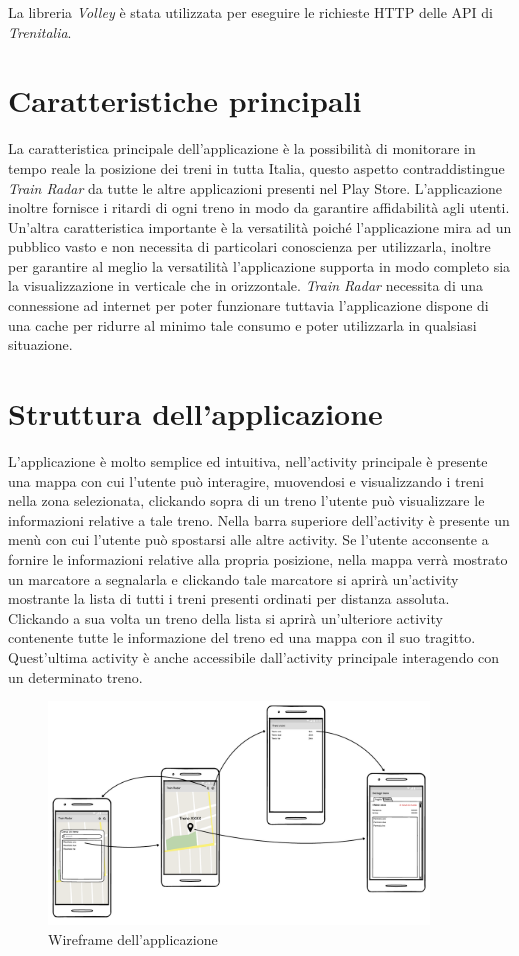 \documentclass[a4paper,10pt]{article}
\begin{document}
    \medskip
    \noindent
    La libreria \emph{Volley} \cite{volley} è stata utilizzata per eseguire le richieste HTTP delle API di \emph{Trenitalia}.

\section{Caratteristiche principali}
  La caratteristica principale dell'applicazione è la possibilità di monitorare in tempo reale la posizione dei treni in tutta Italia, questo aspetto contraddistingue \emph{Train Radar} da tutte le altre applicazioni presenti nel Play Store. L'applicazione inoltre fornisce i ritardi di ogni treno in modo da garantire affidabilità agli utenti. Un'altra caratteristica importante è la versatilità poiché l'applicazione mira ad un pubblico vasto e non necessita di particolari conoscienza per utilizzarla, inoltre per garantire al meglio la versatilità l'applicazione supporta in modo completo sia la visualizzazione in verticale che in orizzontale. \emph{Train Radar} necessita di una connessione ad internet per poter funzionare tuttavia l'applicazione dispone di una cache per ridurre al minimo tale consumo e poter utilizzarla in qualsiasi situazione.

\section{Struttura dell'applicazione}
  L'applicazione è molto semplice ed intuitiva, nell'activity principale è presente una mappa con cui l'utente può interagire, muovendosi e visualizzando i treni nella zona selezionata, clickando sopra di un treno l'utente può visualizzare le informazioni relative a tale treno. Nella barra superiore dell'activity è presente un menù con cui l'utente può spostarsi alle altre activity. Se l'utente acconsente a fornire le informazioni relative alla propria posizione, nella mappa verrà mostrato un marcatore a segnalarla e clickando tale marcatore si aprirà un'activity mostrante la lista di tutti i treni presenti ordinati per distanza assoluta. Clickando a sua volta un treno della lista si aprirà un'ulteriore activity contenente tutte le informazione del treno ed una mappa con il suo tragitto. Quest'ultima activity è anche accessibile dall'activity principale interagendo con un determinato treno.

  \begin{figure}[h!]
    \centering
    \includegraphics[width=0.9\textwidth]{images/wireframe}
    \caption{Wireframe dell'applicazione}
  \end{figure}
\end{document}
